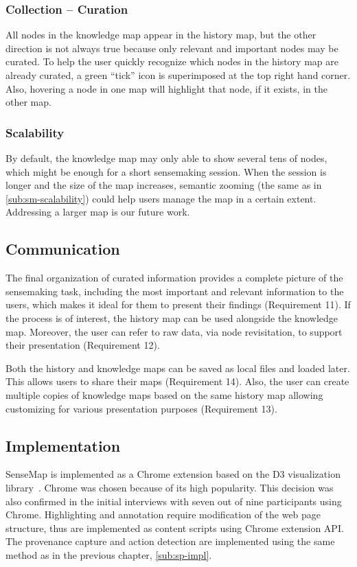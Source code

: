 \subsubsection{Collection -- Curation}
All nodes in the knowledge map appear in the history map, but the other direction is not always true because only relevant and important nodes may be curated. To help the user quickly recognize which nodes in the history map are already curated, a green ``tick'' icon is superimposed at the top right hand corner. Also, hovering a node in one map will highlight that node, if it exists, in the other map.

\subsubsection{Scalability}
By default, the knowledge map may only able to show several tens of nodes, which might be enough for a short sensemaking session. When the session is longer and the size of the map increases, semantic zooming (the same as in \autoref{sub:sm-scalability}) could help users manage the map in a certain extent. Addressing a larger map is our future work.

\subsection{Communication}
The final organization of curated information provides a complete picture of the sensemaking task, including the most important and relevant information to the users, which makes it ideal for them to present their findings (Requirement 11). If the process is of interest, the history map can be used alongside the knowledge map. Moreover, the user can refer to raw data, via node revisitation, to support their presentation (Requirement 12).

Both the history and knowledge maps can be saved as local files and loaded later. This allows users to share their maps (Requirement 14). Also, the user can create multiple copies of knowledge maps based on the same history map allowing customizing for various presentation purposes (Requirement 13).

\subsection{Implementation}
SenseMap is implemented as a Chrome extension based on the D3 visualization library~\cite{Bostock2011}. Chrome was chosen because of its high popularity. This decision was also confirmed in the initial interviews with seven out of nine participants using Chrome. Highlighting and annotation require modification of the web page structure, thus are implemented as content scripts using Chrome extension API. The provenance capture and action detection are implemented using the same method as in the previous chapter, \autoref{sub:sp-impl}.


